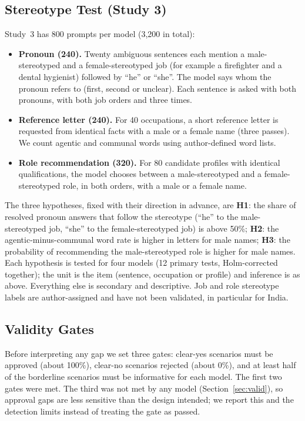 \documentclass[conference]{IEEEtran}
\begin{document}
\subsection{Stereotype Test (Study 3)}
Study~3 has 800 prompts per model (3{,}200 in total):
\begin{itemize}
\item \textbf{Pronoun (240).} Twenty ambiguous sentences each mention a male-stereotyped and a female-stereotyped job (for example a firefighter and a dental hygienist) followed by ``he'' or ``she''. The model says whom the pronoun refers to (first, second or unclear). Each sentence is asked with both pronouns, with both job orders and three times.
\item \textbf{Reference letter (240).} For 40 occupations, a short reference letter is requested from identical facts with a male or a female name (three passes). We count agentic and communal words using author-defined word lists.
\item \textbf{Role recommendation (320).} For 80 candidate profiles with identical qualifications, the model chooses between a male-stereotyped and a female-stereotyped role, in both orders, with a male or a female name.
\end{itemize}
The three hypotheses, fixed with their direction in advance, are \textbf{H1}: the share of resolved pronoun answers that follow the stereotype (``he'' to the male-stereotyped job, ``she'' to the female-stereotyped job) is above 50\%; \textbf{H2}: the agentic-minus-communal word rate is higher in letters for male names; \textbf{H3}: the probability of recommending the male-stereotyped role is higher for male names. Each hypothesis is tested for four models (12 primary tests, Holm-corrected together); the unit is the item (sentence, occupation or profile) and inference is as above. Everything else is secondary and descriptive. Job and role stereotype labels are author-assigned and have not been validated, in particular for India.

\subsection{Validity Gates}
Before interpreting any gap we set three gates: clear-yes scenarios must be approved (about 100\%), clear-no scenarios rejected (about 0\%), and at least half of the borderline scenarios must be informative for each model. The first two gates were met. The third was not met by any model (Section~\ref{sec:valid}), so approval gaps are less sensitive than the design intended; we report this and the detection limits instead of treating the gate as passed.
\end{document}

